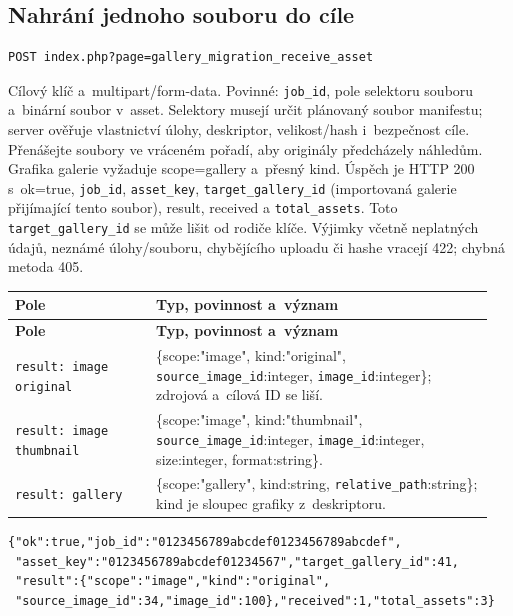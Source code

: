 \documentclass[11pt,a4paper]{article}
\newcommand{\codeword}[1]{\nolinkurl{#1}}
\begin{document}
\subsection{\texorpdfstring{Nahrání jednoho souboru do cíle}{Nahrání jednoho souboru do cíle}}

\label{api352:migration-receive-asset}

\begin{lstlisting}[language={}]
POST index.php?page=gallery_migration_receive_asset
\end{lstlisting}

Cílový klíč a~multipart/form-data. Povinné: \codeword{job_id}, pole selektoru souboru
a~binární soubor v~asset. Selektory musejí určit plánovaný soubor manifestu; server ověřuje
vlastnictví úlohy, deskriptor, velikost/hash i~bezpečnost cíle. Přenášejte soubory ve
vráceném pořadí, aby originály předcházely náhledům. Grafika galerie vyžaduje scope=gallery
a~přesný kind. Úspěch je HTTP 200 s~ok=true, \codeword{job_id}, \codeword{asset_key},
\codeword{target_gallery_id} (importovaná galerie přijímající tento soubor), result,
received a \codeword{total_assets}. Toto \codeword{target_gallery_id} se může lišit od
rodiče klíče. Výjimky včetně neplatných údajů, neznámé úlohy/souboru, chybějícího uploadu či
hashe vracejí 422; chybná metoda 405.

\begin{longtable}{@{}>{\RaggedRight\arraybackslash}p{0.28\linewidth}>{\RaggedRight\arraybackslash}p{0.67\linewidth}@{}}
\toprule
\textbf{Pole} & \textbf{Typ, povinnost a~význam} \\
\midrule
\endfirsthead
\toprule
\textbf{Pole} & \textbf{Typ, povinnost a~význam} \\
\midrule
\endhead
\bottomrule
\endfoot
\codeword{result: image original} & \{scope:"image", kind:"original",
\codeword{source_image_id}:integer, \codeword{image_id}:integer\}; zdrojová a~cílová ID se
liší. \\
\codeword{result: image thumbnail} & \{scope:"image", kind:"thumbnail",
\codeword{source_image_id}:integer, \codeword{image_id}:integer, size:integer,
format:string\}. \\
\codeword{result: gallery} & \{scope:"gallery", kind:string,
\codeword{relative_path}:string\}; kind je sloupec grafiky z~deskriptoru. \\
\end{longtable}

\begin{lstlisting}[language={}]
{"ok":true,"job_id":"0123456789abcdef0123456789abcdef",
 "asset_key":"0123456789abcdef01234567","target_gallery_id":41,
 "result":{"scope":"image","kind":"original",
 "source_image_id":34,"image_id":100},"received":1,"total_assets":3}
\end{lstlisting}
\end{document}
